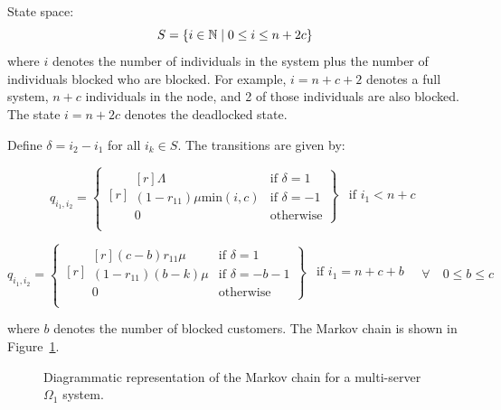 \documentclass{article}
\begin{document}
State space:
        \[S = \{i\in\mathbb{N} \nonscript\; | \nonscript\; 0 \leq i \leq n + 2c\}\]
where \(i\) denotes the number of individuals in the system plus the number of individuals blocked who are blocked.
For example, $i=n+c+2$ denotes a full system, $n+c$ individuals in the node, and 2 of those individuals are also blocked.
The state $i=n+2c$ denotes the deadlocked state.

Define $\delta = i_2 - i_1$ for all $i_k \in S$. The transitions are given by:

\begin{equation}
  q_{i_1, i_2} = \left\{
  \begin{matrix*}[ r ]
    \left. \begin{matrix*}[ r ]
      \Lambda & \text{if } \delta = 1 \\
      (1-r_{11})\mu\text{min}(i, c) & \text{if } \delta = -1 \\
      0 & \text{otherwise}
    \end{matrix*} \right\} & \text{if } i_1 < n + c \\
  \end{matrix*} \right.
\end{equation}

\begin{equation}
  q_{i_1, i_2} = \left\{
  \begin{matrix*}[ r ]
    \left. \begin{matrix*}[ r ]
      (c-b)r_{11}\mu & \text{if } \delta = 1 \\
      (1-r_{11})(b-k)\mu & \text{if } \delta = -b-1\\
      0 & \text{otherwise}
    \end{matrix*} \right\} & \text{if } i_1 = n + c + b \\
  \end{matrix*} \right.
  \quad \forall \quad 0 \leq b \leq c
\end{equation}

where $b$ denotes the number of blocked customers.
The Markov chain is shown in Figure~\ref{fig:1nodeMCms}.

\begin{figure}[!htbp]
    \begin{center}
    
    \end{center}
    \caption{Diagrammatic representation of the Markov chain for a multi-server $\Omega_1$ system.}
    \label{fig:1nodeMCms}
\end{figure}
\end{document}
